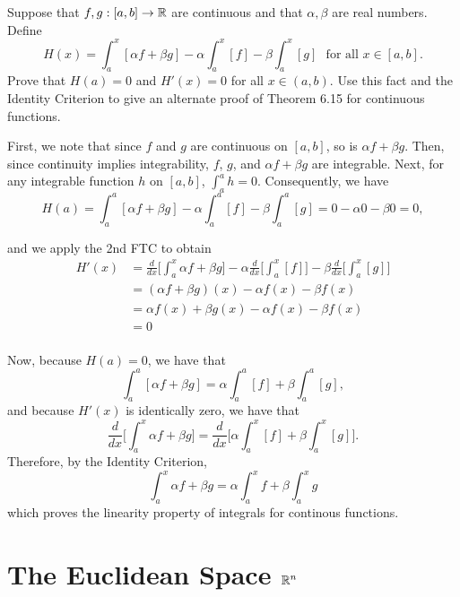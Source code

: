 \documentclass[letterpaper, twoside, 12pt]{book}
\begin{document}
\begin{exercise}[12]
  Suppose that \(f,g:[a,b]\to\mathbb R\) are continuous and that \(\alpha,\beta\)
  are real numbers. Define
  \[
    H(x)
      =
    \int_a^x[\alpha f+\beta g]-\alpha\int_a^x[f]-\beta\int_a^x[g]
    \text{~~for all~} x\in[a,b]
  .\]
  Prove that \(H(a)=0\) and \(H'(x)=0\) for all \(x\in(a,b)\).
  Use this fact and the Identity Criterion to give an alternate proof of
  Theorem 6.15 for continuous functions.
\end{exercise}

\begin{solution}
    First, we note that since \(f\) and \(g\) are continuous on \([a,b]\), so is
    \(\alpha f + \beta g\). Then, since continuity implies integrability,
    \(f\), \(g\), and \(\alpha f + \beta g\) are integrable. Next, for any 
    integrable function \(h\) on \([a,b]\), \(\int_a^a h = 0\). Consequently, 
    we have
    \[ H(a) = \int_a^a [\alpha f + \beta g] - \alpha \int_a^a [f] - \beta \int_a^a [g] 
            = 0 - \alpha 0 - \beta 0 = 0 ,\]
    
    and we apply the 2nd FTC to obtain
    \begin{align*}
        H'(x) &= \frac{d}{dx} \Bigg[ \int_a^x \alpha f + \beta g \Bigg] - \alpha \frac{d}{dx} \Bigg[ \int_a^x [f] \Bigg] - \beta \frac{d}{dx} \Bigg[ \int_a^x [g] \Bigg] \\
              &= (\alpha f + \beta g)(x) - \alpha f(x) - \beta f(x) \\
              &= \alpha f(x) + \beta g(x) - \alpha f(x) - \beta f(x) \\
              &= 0 \\
    \end{align*}

    Now, because \(H(a) = 0\), we have that
    \[ \int_a^a [\alpha f + \beta g] = \alpha \int_a^a [f] + \beta \int_a^a [g] ,\]
    and because \(H'(x)\) is identically zero, we have that
    \[ \frac{d}{dx} \Bigg[ \int_a^x \alpha f + \beta g \Bigg] = \frac{d}{dx} \Bigg[ \alpha \int_a^x [f] + \beta \int_a^x [g] \Bigg] .\]
    Therefore, by the Identity Criterion, 
    \[ \int_a^x \alpha f + \beta g = \alpha \int_a^x f + \beta \int_a^x g \]
    which proves the linearity property of integrals for continous functions.
\end{solution}



\setcounter{chapter}{9}
\chapter{The Euclidean Space \texorpdfstring{$\mathbb R^n$}{Rn}}
\end{document}
